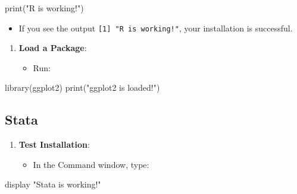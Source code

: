 \documentclass[
  letterpaper,
  DIV=11,
  numbers=noendperiod]{scrreprt}
\newenvironment{Shaded}{\begin{snugshade}}{\end{snugshade}}
\newcommand{\FunctionTok}[1]{\textcolor[rgb]{0.28,0.35,0.67}{#1}}
\newcommand{\KeywordTok}[1]{\textcolor[rgb]{0.00,0.23,0.31}{#1}}
\newcommand{\NormalTok}[1]{\textcolor[rgb]{0.00,0.23,0.31}{#1}}
\newcommand{\StringTok}[1]{\textcolor[rgb]{0.13,0.47,0.30}{#1}}
\providecommand{\tightlist}{%
  \setlength{\itemsep}{0pt}\setlength{\parskip}{0pt}}\usepackage{longtable,booktabs,array}
\begin{document}
\begin{Shaded}
\begin{Highlighting}[]
   \FunctionTok{print}\NormalTok{(}\StringTok{"R is working!"}\NormalTok{)}
\end{Highlighting}
\end{Shaded}

\begin{itemize}
\tightlist
\item
  If you see the output \texttt{{[}1{]}\ "R\ is\ working!"}, your
  installation is successful.
\end{itemize}

\begin{enumerate}
\def\labelenumi{\arabic{enumi}.}
\setcounter{enumi}{1}
\tightlist
\item
  \textbf{Load a Package}:

  \begin{itemize}
  \tightlist
  \item
    Run:
  \end{itemize}
\end{enumerate}

\begin{Shaded}
\begin{Highlighting}[]
   \FunctionTok{library}\NormalTok{(ggplot2)}
   \FunctionTok{print}\NormalTok{(}\StringTok{"ggplot2 is loaded!"}\NormalTok{)}
\end{Highlighting}
\end{Shaded}

\subsection{Stata}\label{stata}

\begin{enumerate}
\def\labelenumi{\arabic{enumi}.}
\tightlist
\item
  \textbf{Test Installation}:

  \begin{itemize}
  \tightlist
  \item
    In the Command window, type:
  \end{itemize}
\end{enumerate}

\begin{Shaded}
\begin{Highlighting}[]
   \KeywordTok{display} \StringTok{"Stata is working!"}
\end{Highlighting}
\end{Shaded}
\end{document}
